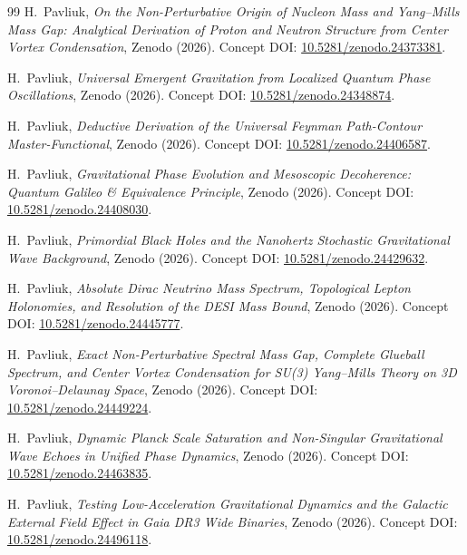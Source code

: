 \documentclass[11pt,a4paper]{article}
\theoremstyle{definition}
\begin{document}
\begin{thebibliography}{99}
H.~Pavliuk, \textit{On the Non-Perturbative Origin of Nucleon Mass and Yang--Mills Mass Gap: Analytical Derivation of Proton and Neutron Structure from Center Vortex Condensation}, Zenodo (2026). Concept DOI: \href{https://doi.org/10.5281/zenodo.24373381}{10.5281/zenodo.24373381}.

H.~Pavliuk, \textit{Universal Emergent Gravitation from Localized Quantum Phase Oscillations}, Zenodo (2026). Concept DOI: \href{https://doi.org/10.5281/zenodo.24348874}{10.5281/zenodo.24348874}.

H.~Pavliuk, \textit{Deductive Derivation of the Universal Feynman Path-Contour Master-Functional}, Zenodo (2026). Concept DOI: \href{https://doi.org/10.5281/zenodo.24406587}{10.5281/zenodo.24406587}.

H.~Pavliuk, \textit{Gravitational Phase Evolution and Mesoscopic Decoherence: Quantum Galileo \& Equivalence Principle}, Zenodo (2026). Concept DOI: \href{https://doi.org/10.5281/zenodo.24408030}{10.5281/zenodo.24408030}.

H.~Pavliuk, \textit{Primordial Black Holes and the Nanohertz Stochastic Gravitational Wave Background}, Zenodo (2026). Concept DOI: \href{https://doi.org/10.5281/zenodo.24429632}{10.5281/zenodo.24429632}.

H.~Pavliuk, \textit{Absolute Dirac Neutrino Mass Spectrum, Topological Lepton Holonomies, and Resolution of the DESI Mass Bound}, Zenodo (2026). Concept DOI: \href{https://doi.org/10.5281/zenodo.24445777}{10.5281/zenodo.24445777}.

H.~Pavliuk, \textit{Exact Non-Perturbative Spectral Mass Gap, Complete Glueball Spectrum, and Center Vortex Condensation for SU(3) Yang--Mills Theory on 3D Voronoi--Delaunay Space}, Zenodo (2026). Concept DOI: \href{https://doi.org/10.5281/zenodo.24449224}{10.5281/zenodo.24449224}.

H.~Pavliuk, \textit{Dynamic Planck Scale Saturation and Non-Singular Gravitational Wave Echoes in Unified Phase Dynamics}, Zenodo (2026). Concept DOI: \href{https://doi.org/10.5281/zenodo.24463835}{10.5281/zenodo.24463835}.

H.~Pavliuk, \textit{Testing Low-Acceleration Gravitational Dynamics and the Galactic External Field Effect in Gaia DR3 Wide Binaries}, Zenodo (2026). Concept DOI: \href{https://doi.org/10.5281/zenodo.24496118}{10.5281/zenodo.24496118}.


\end{thebibliography}
\end{document}
